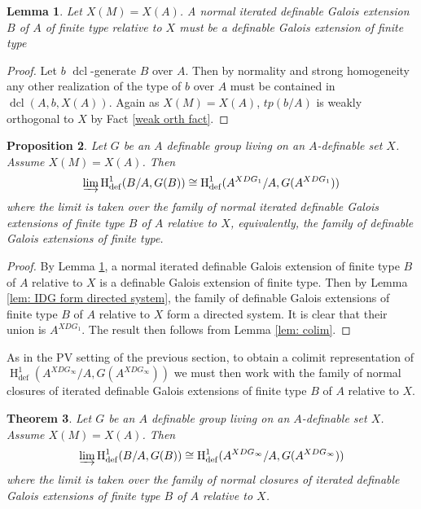 \documentclass{amsart}
\newtheorem{theorem}{Theorem}[section]
\newtheorem{proposition}[theorem]{Proposition}
\newtheorem{lemma}[theorem]{Lemma}
\theoremstyle{definition}
\theoremstyle{remark}
\numberwithin{equation}{section}
\def \tp {tp}
\def \defin {\operatorname{def}}
\def \HH {\operatorname{H}}
\def \dcl {\operatorname{dcl}}
\begin{document}
\begin{lemma}\label{lem: finite type iterated is dg}
    Let $X(M)=X(A)$. A normal iterated definable Galois extension $B$ of $A$ of finite type relative to $X$ must be a definable Galois extension of finite type
\end{lemma}

\begin{proof}
    Let $b$ $\dcl$-generate $B$ over $A$. Then by normality and strong homogeneity any other realization of the type of $b$ over $A$ must be contained in $\dcl(A,b,X(A))$. Again as $X(M)=X(A)$, $\tp(b/A)$ is weakly orthogonal to $X$ by Fact \ref{weak orth fact}. 
\end{proof}

\begin{proposition}\label{prop: idg colim}
    Let $G$ be an $A$ definable group living on an $A$-definable set $X$. Assume $X(M)=X(A)$. Then $$\varinjlim \HH^{1}_{\defin}(B/A, G(B)) \cong \HH^{1}_{\defin}(A^{XDG_1}/A, G(A^{XDG_1}))$$ where the limit is taken over the family of normal iterated definable Galois extensions of finite type $B$ of $A$ relative to $X$, equivalently, the family of definable Galois extensions of finite type.
\end{proposition}

\begin{proof}
    By Lemma \ref{lem: finite type iterated is dg}, a normal iterated definable Galois extension of finite type $B$ of $A$ relative to $X$ is a definable Galois extension of finite type. Then by Lemma \ref{lem: IDG form directed system}, the family of definable Galois extensions of finite type $B$ of $A$ relative to $X$ form a directed system. It is clear that their union is $A^{XDG_1}$. The result then follows from Lemma \ref{lem: colim}. 
\end{proof}

As in the PV setting of the previous section, to obtain a colimit representation of $\HH^{1}_{\defin}(A^{XDG_\infty}/A, G(A^{XDG_\infty}))$ we must then work with the family of normal closures of iterated definable Galois extensions of finite type $B$ of $A$ relative to $X$.

\begin{theorem}\label{thm: idg colim}
    Let $G$ be an $A$ definable group living on an $A$-definable set $X$. Assume $X(M)=X(A)$. Then $$\varinjlim \HH^{1}_{\defin}(B/A, G(B)) \cong \HH^{1}_{\defin}(A^{XDG_\infty}/A, G(A^{XDG_\infty}))$$ where the limit is taken over the family of normal closures of iterated definable Galois extensions of finite type $B$ of $A$ relative to $X$.
\end{theorem}
\end{document}

